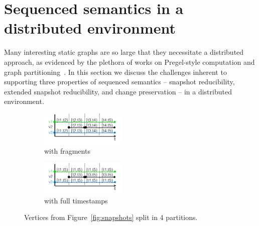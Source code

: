 \section{Sequenced semantics in a \\ distributed environment}
\label{sec:consider}


Many interesting static graphs are so large that they necessitate a
distributed approach, as evidenced by the plethora of works on
Pregel-style computation and graph partitioning~\cite{McCune2015}.
  In
this section we discuss the challenges inherent to supporting three
properties of sequenced semantics -- snapshot reducibility, extended
snapshot reducibility, and change preservation -- in a distributed
environment.



\begin{figure}
\begin{subfigure}[b]{1.6in}
\includegraphics[width=1.6in]{figs/split.pdf}
\caption{with fragments}
\vspace{-0.1cm}
\label{fig:split}
\end{subfigure}
\begin{subfigure}[b]{1.6in}
\includegraphics[width=1.6in]{figs/split2.pdf}
\caption{with full timestamps}
\vspace{-0.1cm}
\label{fig:split2}
\end{subfigure}
\caption{Vertices from Figure~\ref{fig:snapshots} split in 4 partitions.}
\vspace{-0.3cm}
\end{figure}

